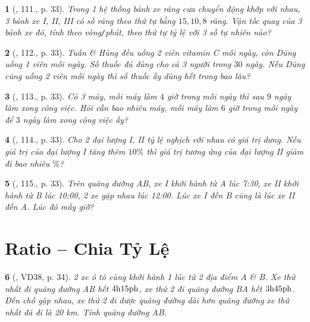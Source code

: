 \documentclass{article}
\newtheorem{baitoan}{}
\begin{document}
\begin{baitoan}[\cite{Binh_Toan_7_tap_1}, 111., p. 33]
	Trong 1 hệ thống bánh xe răng cưa chuyển động khớp với nhau, 3 bánh xe I, II, III có số răng theo thứ tự bằng $15,10,8$ răng. Vận tốc quay của 3 bánh xe đó, tính theo vòng{\tt/}phút, theo thứ tự tỷ lệ với 3 số tự nhiên nào?
\end{baitoan}

\begin{baitoan}[\cite{Binh_Toan_7_tap_1}, 112., p. 33]
	Tuấn \& Hùng đều uống 2 viên vitamin C mỗi ngày, còn Dũng uống 1 viên mỗi ngày. Số thuốc đủ dùng cho cả 3 người trong $30$ ngày. Nếu Dũng cũng uống 2 viên mỗi ngày thì số thuốc ấy dùng hết trong bao lâu?
\end{baitoan}

\begin{baitoan}[\cite{Binh_Toan_7_tap_1}, 113., p. 33]
	Có 3 máy, mỗi máy làm $4$ giờ trong mỗi ngày thì sau $9$ ngày làm xong công việc. Hỏi cần bao nhiêu máy, mỗi máy làm $6$ giờ trong mỗi ngày để $3$ ngày làm xong công việc ấy?
\end{baitoan}

\begin{baitoan}[\cite{Binh_Toan_7_tap_1}, 114., p. 33]
	Cho 2 đại lượng I, II tỷ lệ nghịch với nhau có giá trị dưng. Nếu giá trị của đại lượng I tăng thêm $10\%$ thì giá trị tương ứng của đại lượng II giảm đi bao nhiêu $\%$?
\end{baitoan}

\begin{baitoan}[\cite{Binh_Toan_7_tap_1}, 115., p. 33]
	Trên quãng đường AB, xe I khởi hành từ A lúc {\rm7:30}, xe II khởi hành từ B lúc {\rm10:00}, 2 xe gặp nhau lúc {\rm12:00}. Lúc xe I đến B cũng là lúc xe II đến A. Lúc đó mấy giờ?
\end{baitoan}


\section{Ratio -- Chia Tỷ Lệ}

\begin{baitoan}[\cite{Binh_Toan_7_tap_1}, VD38, p. 34]
	2 xe ô tô cùng khởi hành 1 lúc từ 2 địa điểm A \& B. Xe thứ nhất đi quãng đường AB hết $\rm4h15ph$, xe thứ 2 đi quãng đường BA hết $\rm3h45ph$. Đến chỗ gặp nhau, xe thứ 2 đi được quãng đường dài hơn quãng đường xe thứ nhất đã đi là {\rm20 km}. Tính quãng đường AB.
\end{baitoan}
\end{document}
